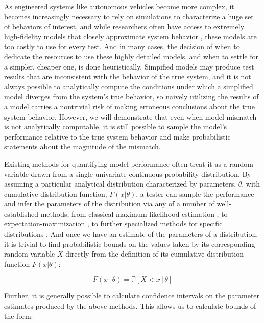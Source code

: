 \documentclass[letterpaper, 10 pt, conference]{ieeeconf}
\begin{document}
As engineered systems like autonomous vehicles become more complex, it becomes increasingly necessary to rely on simulations to characterize a huge set of behaviors of interest, and while researchers often have access to extremely high-fidelity models that closely approximate system behavior \cite{mcruer75, pearce62}, these models are too costly to use for every test. And in many cases, the decision of when to dedicate the resources to use these highly detailed models, and when to settle for a simpler, cheaper one, is done heuristically. Simpified models may produce test results that are inconsistent with the behavior of the true system, and it is not always possible to analytically compute the conditions under which a simplified model diverges from the system's true behavior, so naively utilizing the results of a model carries a nontrivial risk of making erroneous conclusions about the true system behavior. However, we will demonstrate that even when model mismatch is not analytically computable, it is still possible to sample the model's performance relative to the true system behavior and make probabilistic statements about the magnitude of the mismatch.
\newline

Existing methods for quantifying model performance often treat it as a random variable drawn from a single univariate continuous probability distribution. By assuming a particular analytical distribution characterized by parameters, $\theta$, with cumulative distribution function, $F(x|\theta)$, a tester can sample the performance and infer the parameters of the distribution via any of a number of well-established methods, from classical maximum likelihood estimation \cite{gelman13}, to expectation-maximization \cite{dempster77}, to further specialized methods for specific distributions \cite{tang19,ren22}. And once we have an estimate of the parameters of a distribution, it is trivial to find probabilistic bounds on the values taken by its corresponding random variable $X$ directly from the definition of its cumulative distribution function $F(x|\theta)$:

\begin{equation}
    F(x\,|\,\theta) = \mathbb{P}[X<x\,|\,\theta] \nonumber
\end{equation}

Further, it is generally possible to calculate confidence intervals on the parameter estimates produced by the above methods. This allows us to calculate bounds of the form:
\end{document}

